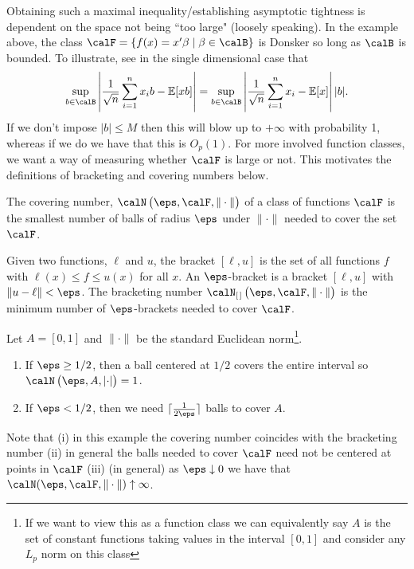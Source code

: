 Obtaining such a maximal inequality/establishing asymptotic tightness is dependent on the space not being ``too large" (loosely speaking). In the example above, the class \(\calF = \{f(x) = x'\beta\mid \beta\in\calB\} \) is Donsker so long as \(\calB\) is bounded. To illustrate, see in the single dimensional case that
\[
	\sup_{b\in \calB}\left|\frac{1}{\sqrt{n}}\sum_{i=1}^n x_ib - \E[xb] \right| = \sup_{b\in\calB} \left|\frac{1}{\sqrt{n}}\sum_{i=1}^n x_i - \E[x] \right||b|
.\]
If we don't impose \(|b|\leq M\) then this will blow up to \(+\infty\) with probability 1, whereas if we do we have that this is  \(O_p(1)\). For more involved function classes, we want a way of measuring whether  \(\calF\) is large or not. This motivates the definitions of bracketing and covering numbers below.

\begin{definition}
	\label{def:covering}
	The covering number, \(\calN\left(\eps,\calF,\|\cdot\|\right)\) of a class of functions \(\calF\) is the smallest number of balls of radius  \(\eps\) under  \(\|\cdot\|\) needed to cover the set \(\calF\).
\end{definition}

\begin{definition}
	\label{def:bracketing}
	Given two functions, \(\ell\) and \(u\), the bracket \([\ell,u]\) is the set of all functions  \(f\) with  \(\ell(x)\leq f\leq u(x)\) for all \(x\). An  \(\eps\)-bracket is a bracket  \([\ell,u]\) with  \(\|u-\ell\|< \eps\). The bracketing number \(\calN_{[\hspace{0.1em}]}\left(\eps,\calF,\|\cdot\|\right)\) is the minimum number of \(\eps\)-brackets needed to cover  \(\calF\).
\end{definition}

\begin{example}
	\label{ex:covering}
	Let \(A = [0,1]\) and  \(\|\cdot\|\) be the standard Euclidean norm\footnote{If we want to view this as a function class we can equivalently say \(A\) is the set of constant functions taking values in the interval  \([0,1]\) and consider any \(L_p\) norm on this class}.
	\begin{enumerate}
		\item If \(\eps \geq 1/2\), then a ball centered at  \(1/2\) covers the entire interval so  \(\calN\left(\eps,A,\left|\cdot\right|\right) = 1\).
		\item If \(\eps < 1/2\), then we need \(\lceil \frac{1}{2\eps}\rceil\) balls to cover \(A\).
	\end{enumerate}
	Note that (i) in this example the covering number coincides with the bracketing number (ii) in general the balls needed to cover \(\calF\) need not be centered at points in \(\calF\) (iii) (in general) as \(\eps\downarrow 0\) we have that  \(\calN(\eps,\calF,\|\cdot\|)\uparrow\infty\). 
\end{example}

